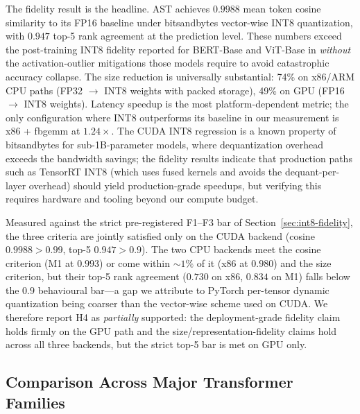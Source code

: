 \documentclass[conference]{IEEEtran}
\begin{document}
The fidelity result is the headline. AST achieves $0.9988$ mean token cosine similarity to its FP16 baseline under bitsandbytes vector-wise INT8 quantization, with $0.947$ top-5 rank agreement at the prediction level. These numbers exceed the post-training INT8 fidelity reported for BERT-Base and ViT-Base in \cite{bondarenko2023quantizable} \emph{without} the activation-outlier mitigations those models require to avoid catastrophic accuracy collapse. The size reduction is universally substantial: 74\% on x86/ARM CPU paths (FP32 $\to$ INT8 weights with packed storage), 49\% on GPU (FP16 $\to$ INT8 weights). Latency speedup is the most platform-dependent metric; the only configuration where INT8 outperforms its baseline in our measurement is x86 + fbgemm at $1.24\times$. The CUDA INT8 regression is a known property of bitsandbytes for sub-1B-parameter models, where dequantization overhead exceeds the bandwidth savings; the fidelity results indicate that production paths such as TensorRT INT8 (which uses fused kernels and avoids the dequant-per-layer overhead) should yield production-grade speedups, but verifying this requires hardware and tooling beyond our compute budget.

Measured against the strict pre-registered F1--F3 bar of Section~\ref{sec:int8-fidelity}, the three criteria are jointly satisfied only on the CUDA backend (cosine $0.9988 > 0.99$, top-5 $0.947 > 0.9$). The two CPU backends meet the cosine criterion (M1 at $0.993$) or come within $\sim 1\%$ of it (x86 at $0.980$) and the size criterion, but their top-5 rank agreement ($0.730$ on x86, $0.834$ on M1) falls below the $0.9$ behavioural bar---a gap we attribute to PyTorch per-tensor dynamic quantization being coarser than the vector-wise scheme used on CUDA. We therefore report H4 as \emph{partially} supported: the deployment-grade fidelity claim holds firmly on the GPU path and the size/representation-fidelity claims hold across all three backends, but the strict top-5 bar is met on GPU only.

\subsection{Comparison Across Major Transformer Families}
\label{sec:int8-comparison}
\end{document}

